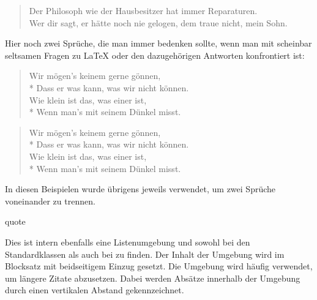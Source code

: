 \begin{Example}
\begin{lstcode}
  \begin{verse}
    Der Philosoph wie der Hausbesitzer\nopagebreak{}
    hat immer Reparaturen.\\
    \bigskip
    Wer dir sagt, er hätte noch nie\nopagebreak{}
    gelogen, dem traue nicht, mein Sohn.
  \end{verse}
\end{lstcode}
      \iftrue%
        Hier noch zwei Sprüche, die man immer bedenken sollte, wenn man mit
        scheinbar seltsamen Fragen zu {\LaTeX} oder den dazugehörigen Antworten
        konfrontiert ist:
\begin{lstcode}
  \begin{verse}
    Wir mögen's keinem gerne gönnen,\\*
    Dass er was kann, was wir nicht können.\\
    \bigskip
    Wie klein ist das, was einer ist,\\*
    Wenn man's mit seinem Dünkel misst.
  \end{verse}
\end{lstcode}
        \begin{ShowOutput}
          \begin{verse}
            Wir mögen's keinem gerne gönnen,\\*
            Dass er was kann, was wir nicht können.\\
            \bigskip
            Wie klein ist das, was einer ist,\\*
            Wenn man's mit seinem Dünkel misst.
          \end{verse}
        \end{ShowOutput}
      \fi
      In diesen Beispielen wurde übrigens jeweils  verwendet,
      um zwei Sprüche voneinander zu trennen.
    \end{Example}%
  \fi
  \EndIndexGroup


  \iftrue%
    \begin{Declaration}
      \begin{Environment}{quote}\end{Environment}
    \end{Declaration}%
    Dies ist
    intern ebenfalls eine Listenumgebung und sowohl bei den Standardklassen als auch bei
    {\KOMAScript} zu finden. Der Inhalt der Umgebung wird im Blocksatz mit
    beidseitigem Einzug gesetzt. Die Umgebung wird häufig verwendet, um
    längere Zitate abzusetzen. Dabei werden Absätze innerhalb der
    Umgebung durch einen vertikalen Abstand gekennzeichnet.%
    \EndIndexGroup

